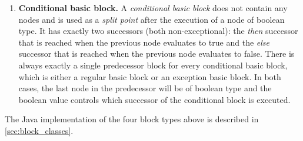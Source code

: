 \begin{definition}
\begin{enumerate}
        \item \textbf{Conditional basic block.} A \emph{conditional
          basic block} does not contain any nodes and is used as a
          \emph{split point} after the execution of a node of boolean
          type. It has exactly two successors (both non-exceptional):
          the \emph{then} successor that is reached when the previous node
          evaluates to true and the \emph{else} successor that is reached
          when the previous node evaluates to false.  There is always
          exactly a single predecessor block for every conditional
          basic block, which is either a regular basic block or an
          exception basic block. In both cases, the last node in the
          predecessor will be of boolean type and the boolean value
          controls which successor of the conditional block is
          executed.
    \end{enumerate}
\end{definition}

The Java implementation of the four block types above is described in
\autoref{sec:block_classes}.

